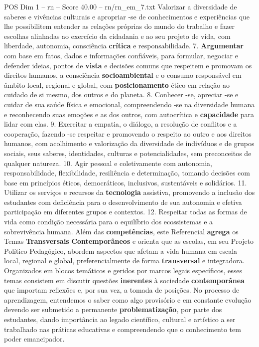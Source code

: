 \begin{textsample}{POS Dim 1 – rn – Score 40.00 – rn/rn\_em\_7.txt}
Valorizar a diversidade de saberes e vivências culturais e apropriar -se de conhecimentos e experiências que lhe possibilitem entender as relações próprias do mundo do trabalho e fazer escolhas alinhadas ao exercício da cidadania e ao seu projeto de vida, com liberdade, autonomia, consciência \textbf{crítica} e responsabilidade. 7. \textbf{Argumentar} com base em fatos, dados e informações confiáveis, para formular, negociar e defender ideias, pontos de \textbf{vista} e decisões comuns que respeitem e promovam os direitos humanos, a consciência \textbf{socioambiental} e o consumo responsável em âmbito local, regional e global, com \textbf{posicionamento} ético em relação ao cuidado de si mesmo, dos outros e do planeta. 8.
Conhecer -se, apreciar -se e cuidar de sua saúde física e emocional, compreendendo -se na diversidade humana e reconhecendo suas emoções e as dos outros, com autocrítica e \textbf{capacidade} para lidar com elas. 9.
Exercitar a empatia, o diálogo, a resolução de conflitos e a cooperação, fazendo -se respeitar e promovendo o respeito ao outro e aos direitos humanos, com acolhimento e valorização da diversidade de indivíduos e de grupos sociais, seus saberes, identidades, culturas e potencialidades, sem preconceitos de qualquer natureza. 10.
Agir pessoal e coletivamente com autonomia, responsabilidade, flexibilidade, resiliência e determinação, tomando decisões com base em princípios éticos, democráticos, inclusivos, sustentáveis e solidários. 11.
Utilizar os serviços e recursos da \textbf{tecnologia} assistiva, promovendo a inclusão dos estudantes com deficiência para o desenvolvimento de sua autonomia e efetiva participação em diferentes grupos e contextos. 12.
Respeitar todas as formas de vida como condição necessária para o equilíbrio dos ecossistemas e a sobrevivência humana.
Além das \textbf{competências}, este Referencial \textbf{agrega} os Temas \textbf{Transversais} \textbf{Contemporâneos} e orienta que as escolas, em seu Projeto Político Pedagógico, abordem aspectos que afetam a vida humana em escala local, regional e global, preferencialmente de forma \textbf{transversal} e integradora.
Organizados em blocos temáticos e geridos por marcos legais específicos, esses temas consistem em discutir questões \textbf{inerentes} à sociedade \textbf{contemporânea} que importam reflexões e, por sua vez, a tomada de posições.
No processo de aprendizagem, entendemos o saber como algo provisório e em constante evolução devendo ser submetido a permanente \textbf{problematização}, por parte dos estudantes, dando importância ao legado científico, cultural e artístico a ser trabalhado nas práticas educativas e compreendendo que o conhecimento tem poder emancipador.

\end{textsample}
